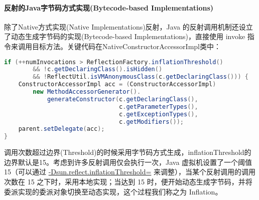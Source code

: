 \documentclass[../../../interview-questions.tex]{subfiles}
\begin{document}
\paragraph{反射的Java字节码方式实现(Bytecode-based Implementations)}

除了Native方式实现(Native Implementations)反射，Java 的反射调用机制还设立了动态生成字节码的实现(Bytecode-based Implementations)，直接使用 invoke 指令来调用目标方法。关键代码在NativeConstructorAccessorImpl类中：

\begin{lstlisting}[language=Java]
if (++numInvocations > ReflectionFactory.inflationThreshold()
        && !c.getDeclaringClass().isHidden()
        && !ReflectUtil.isVMAnonymousClass(c.getDeclaringClass())) {
    ConstructorAccessorImpl acc = (ConstructorAccessorImpl)
        new MethodAccessorGenerator().
            generateConstructor(c.getDeclaringClass(),
                                c.getParameterTypes(),
                                c.getExceptionTypes(),
                                c.getModifiers());
    parent.setDelegate(acc);
}
\end{lstlisting}

调用次数超过边界(Threshold)的时候采用字节码方式生成，inflationThreshold的边界默认是15。考虑到许多反射调用仅会执行一次，Java 虚拟机设置了一个阈值 15（可以通过 \url{-Dsun.reflect.inflationThreshold=} 来调整），当某个反射调用的调用次数在 15 之下时，采用本地实现；当达到 15 时，便开始动态生成字节码，并将委派实现的委派对象切换至动态实现，这个过程我们称之为 Inflation。
\end{document}
